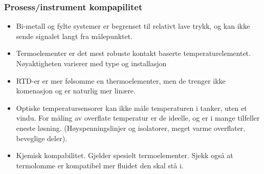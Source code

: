 \documentclass[aspectratio=169,xcolor=dvipsnames]{beamer}
\begin{document}
%
%
%
%
%
\begin{frame}
	\frametitle{Prosess/instrument kompapilitet}

%

	\begin{itemize}
		\item Bi-metall og fylte systemer er begrenset til relativt lave trykk, og kan ikke sende signalet langt fra målepunktet. 
		\item Termoelementer er det mest robuste kontakt baserte temperaturelementet. Nøyaktigheten varierer med type og installasjon
		\item RTD-er er mer følsomme en thermoelementer, men de trenger ikke komenasjon og er naturlig mer linære.
		\item Optiske temperatursensorer kan ikke måle temperaturen i tanker, uten et vindu. For måling av overflate temperatur er de ideelle, og er i mange tilfeller eneste løsning. (Høyspenningslinjer og isolatorer, meget varme overflater, beveglige deler). 
		\item Kjemisk kompabilitet. Gjelder spesielt termoelementer. Sjekk også at termolomme er kompatibel mer fluidet den skal stå i. 
	\end{itemize}


\vskip 10pt

%
\end{frame}
%
%
%
%
\end{document}
